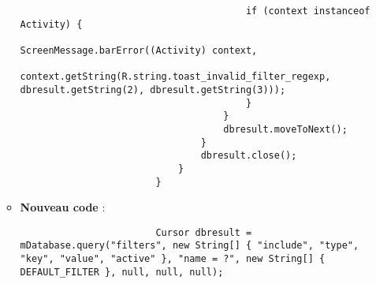 \begin{enumerate}
\begin{itemize}
\begin{verbatim}
                                        if (context instanceof Activity) {
                                            ScreenMessage.barError((Activity) context,
                                                    context.getString(R.string.toast_invalid_filter_regexp, dbresult.getString(2), dbresult.getString(3)));
                                        }
                                    }
                                    dbresult.moveToNext();
                                }
                                dbresult.close();
                            }
                        }
                    \end{verbatim}
              \item \textbf{Nouveau code} :
                    \begin{verbatim}
                        Cursor dbresult = mDatabase.query("filters", new String[] { "include", "type", "key", "value", "active" }, "name = ?", new String[] { DEFAULT_FILTER }, null, null, null);
                    \end{verbatim}
          \end{itemize}
\end{enumerate}
